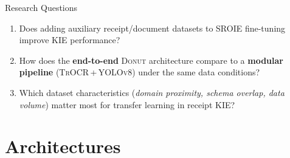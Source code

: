 \documentclass[aspectratio=169,11pt]{beamer}
\newcommand{\donut}{\textsc{Donut}\xspace}
\newcommand{\trocr}{\textsc{TrOCR}\xspace}
\newcommand{\yolo}{\textsc{YOLOv8}\xspace}
\begin{document}
\begin{frame}{Research Questions}
  \begin{enumerate}
    \item[\textcolor{PrimaryBlue}{\textbf{RQ1}}]
      Does adding auxiliary receipt/document datasets to SROIE fine-tuning
      improve KIE performance?
    \vspace{0.4cm}
    \item[\textcolor{PrimaryBlue}{\textbf{RQ2}}]
      How does the \textbf{end-to-end} \donut architecture compare to a
      \textbf{modular pipeline} (\trocr\,+\,\yolo) under the same data
      conditions?
    \vspace{0.4cm}
    \item[\textcolor{PrimaryBlue}{\textbf{RQ3}}]
      Which dataset characteristics (\textit{domain proximity, schema overlap,
      data volume}) matter most for transfer learning in receipt KIE?
  \end{enumerate}
\end{frame}

\section{Architectures}
\end{document}
